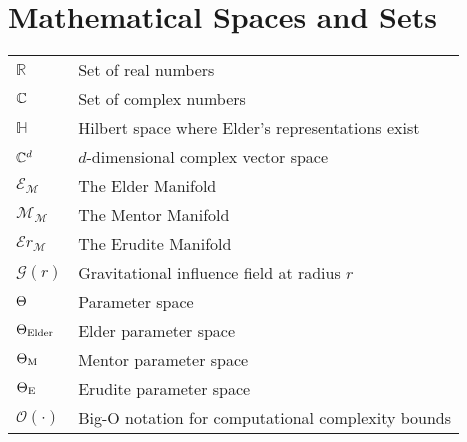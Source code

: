 \section*{Mathematical Spaces and Sets}
\vspace{-0.5em}
\begin{tabular}{p{3cm} p{12cm}}
$\mathbb{R}$ & Set of real numbers \\
$\mathbb{C}$ & Set of complex numbers \\
$\mathbb{H}$ & Hilbert space where Elder's representations exist \\
$\mathbb{C}^{d}$ & $d$-dimensional complex vector space \\
$\mathcal{E}_{\mathcal{M}}$ & The Elder Manifold \\
$\mathcal{M}_{\mathcal{M}}$ & The Mentor Manifold \\
$\mathcal{E}r_{\mathcal{M}}$ & The Erudite Manifold \\
$\mathcal{G}(r)$ & Gravitational influence field at radius $r$ \\
$\Theta$ & Parameter space \\
$\Theta_{\text{Elder}}$ & Elder parameter space \\
$\Theta_{\text{M}}$ & Mentor parameter space \\
$\Theta_{\text{E}}$ & Erudite parameter space \\
$\mathcal{O}(\cdot)$ & Big-O notation for computational complexity bounds \\
\end{tabular}

\newpage

